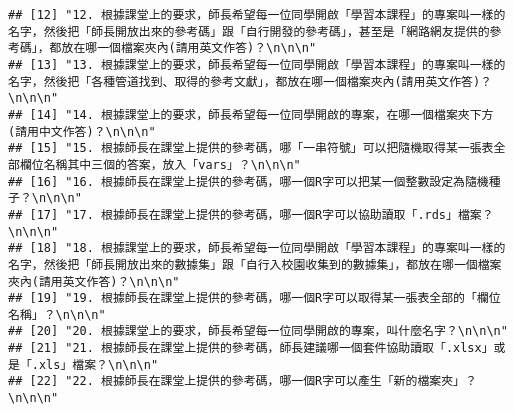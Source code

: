 \documentclass[
]{article}
\begin{document}
\begin{verbatim}
## [12] "12. 根據課堂上的要求，師長希望每一位同學開啟「學習本課程」的專案叫一樣的名字，然後把「師長開放出來的參考碼」跟「自行開發的參考碼」，甚至是「網路網友提供的參考碼」，都放在哪一個檔案夾內(請用英文作答)？\n\n\n"                          
## [13] "13. 根據課堂上的要求，師長希望每一位同學開啟「學習本課程」的專案叫一樣的名字，然後把「各種管道找到、取得的參考文獻」，都放在哪一個檔案夾內(請用英文作答)？\n\n\n"                                                                        
## [14] "14. 根據課堂上的要求，師長希望每一位同學開啟的專案，在哪一個檔案夾下方(請用中文作答)？\n\n\n"                                                                                                                                            
## [15] "15. 根據師長在課堂上提供的參考碼，哪「一串符號」可以把隨機取得某一張表全部欄位名稱其中三個的答案，放入「vars」？\n\n\n"                                                                                                                  
## [16] "16. 根據師長在課堂上提供的參考碼，哪一個R字可以把某一個整數設定為隨機種子？\n\n\n"                                                                                                                                                       
## [17] "17. 根據師長在課堂上提供的參考碼，哪一個R字可以協助讀取「.rds」檔案？\n\n\n"                                                                                                                                                             
## [18] "18. 根據課堂上的要求，師長希望每一位同學開啟「學習本課程」的專案叫一樣的名字，然後把「師長開放出來的數據集」跟「自行入校園收集到的數據集」，都放在哪一個檔案夾內(請用英文作答)？\n\n\n"                                                  
## [19] "19. 根據師長在課堂上提供的參考碼，哪一個R字可以取得某一張表全部的「欄位名稱」？\n\n\n"                                                                                                                                                   
## [20] "20. 根據課堂上的要求，師長希望每一位同學開啟的專案，叫什麼名字？\n\n\n"                                                                                                                                                                  
## [21] "21. 根據師長在課堂上提供的參考碼，師長建議哪一個套件協助讀取「.xlsx」或是「.xls」檔案？\n\n\n"                                                                                                                                           
## [22] "22. 根據師長在課堂上提供的參考碼，哪一個R字可以產生「新的檔案夾」？\n\n\n"                                                                                                                                                               

\end{verbatim}
\end{document}
